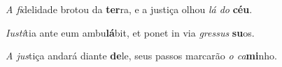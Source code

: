 \begin{greenumerate}
  \switchcolumn%

  \item \textit{A fi}delidade brotou da \textbf{ter}ra, {\GreStar} e a justiça olhou \textit{lá do} \textbf{céu}. 

  \switchcolumn*


  \item \textit{Iustí}tia ante eum ambu\textbf{lá}bit, {\GreStar} et ponet in via \textit{gressus} \textbf{su}os. 

  \switchcolumn%

  \item \textit{A jus}tiça andará diante \textbf{de}le, {\GreStar} seus passos marcarão \textit{o ca}\textbf{mi}nho. 
\end{greenumerate}